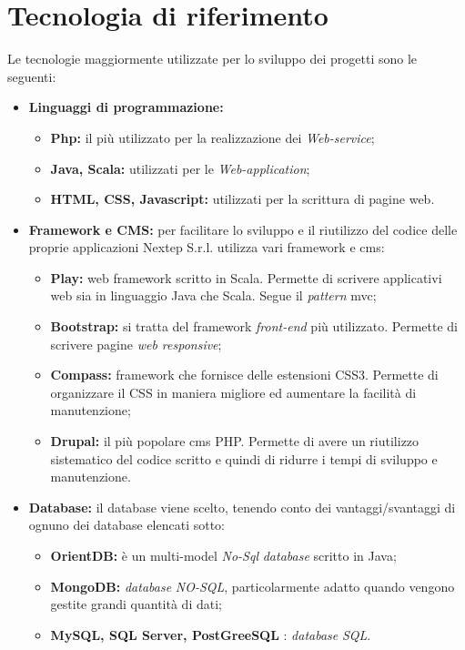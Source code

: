 \section{Tecnologia di riferimento}
Le tecnologie maggiormente utilizzate per lo sviluppo dei progetti sono le seguenti:
\begin{itemize}
	\item \textbf{Linguaggi di programmazione: }
	\begin{itemize}
		\item \textbf{Php: }il più utilizzato per la realizzazione dei \textit{Web-service};
		\item \textbf{Java, Scala: }utilizzati per le \textit{Web-application};
		\item \textbf{HTML, CSS, Javascript: }utilizzati per la scrittura di pagine web.
	\end{itemize}
	\item \textbf{Framework e CMS: }per facilitare lo sviluppo e il riutilizzo del codice delle proprie applicazioni Nextep S.r.l. utilizza vari \gls{framework} e \gls{cms}:
	\begin{itemize}
		\item \textbf{Play: }web \gls{framework} scritto in Scala. Permette di scrivere applicativi web sia in linguaggio Java che Scala. Segue il \textit{pattern }\gls{mvc};
		\item \textbf{Bootstrap: }si tratta del \gls{framework} \textit{front-end }più utilizzato. Permette di scrivere pagine \textit{web responsive};
		\item \textbf{Compass: }\gls{framework} che fornisce delle estensioni CSS3. Permette di organizzare il CSS in maniera migliore ed aumentare la facilità di manutenzione;
		\item \textbf{Drupal: }il più popolare \gls{cms} PHP. Permette di avere un riutilizzo sistematico del codice scritto e quindi di ridurre i tempi di sviluppo e manutenzione.
	\end{itemize}
	\item \textbf{Database: }il database viene scelto, tenendo conto dei vantaggi/svantaggi di ognuno dei database elencati sotto:
	\begin{itemize}
		\item \textbf{OrientDB: }è un multi-model \textit{No-Sql }\textit{database }scritto in Java;
		\item \textbf{MongoDB: }\textit{database} \textit{NO-SQL}, particolarmente adatto quando vengono gestite grandi quantità di dati;
		\item \textbf{MySQL, SQL Server, PostGreeSQL }: \textit{database }\textit{SQL}.
	\end{itemize}
\end{itemize}

